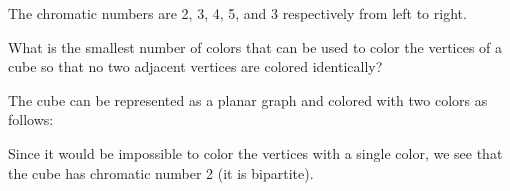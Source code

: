 \begin{questions}
	\begin{answer}
		The chromatic numbers are 2, 3, 4, 5, and 3 respectively from left to right. %
	\end{answer}
	
	

\question What is the smallest number of colors that can be used to color the vertices of a cube so that no two adjacent vertices are colored identically?

	\begin{answer}
		The cube can be represented as a planar graph and colored with two colors as follows:
		
		\begin{center}
		\end{center}
		
		Since it would be impossible to color the vertices with a single color, we see that the cube has chromatic number 2 (it is bipartite).
	\end{answer}

\end{questions}